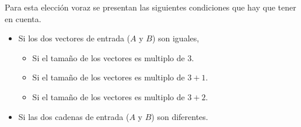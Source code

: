 \documentclass[conference]{IEEEtran}
\begin{document}
Para esta elección voraz se presentan las siguientes condiciones que hay que tener en cuenta.
\begin{itemize}
    \item Si los dos vectores de entrada ($A$ y $B$) son iguales,
        \begin{itemize}
            \item Si el tamaño de los vectores es multiplo de $3$.
            \item Si el tamaño de los vectores es multiplo de $3+1$.
            \item Si el tamaño de los vectores es multiplo de $3+2$.
        \end{itemize}
    \item Si las dos cadenas de entrada ($A$ y $B$) son diferentes.
\end{itemize}
\end{document}
